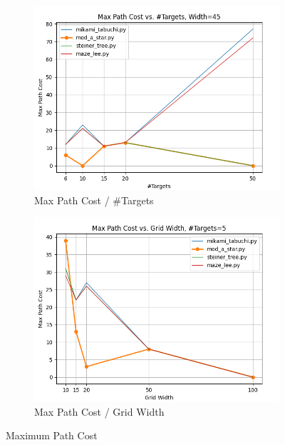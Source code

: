 \begin{figure}
\centering

\begin{subfigure}[b]{\linewidth}
    \includegraphics[width=\linewidth]{figures/plots/maxCost_areaConst.png}
    \caption{Max Path Cost / \#Targets}
\end{subfigure}
\begin{subfigure}[b]{\linewidth}
    \includegraphics[width=\linewidth]{figures/plots/maxCost_nConst.png}
    \caption{Max Path Cost / Grid Width}
\end{subfigure}

\caption{Maximum Path Cost}
\label{fig:maxCost}
\end{figure}

